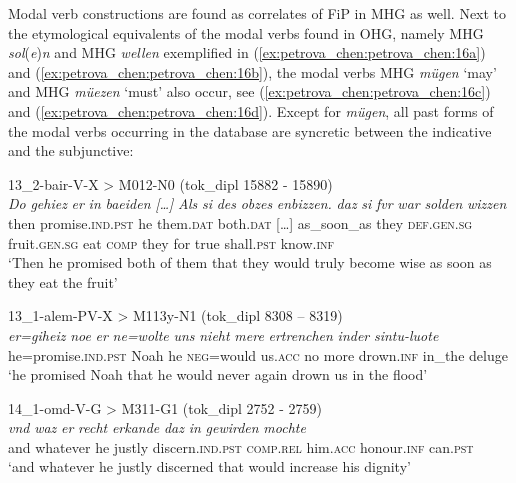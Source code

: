 \documentclass[output=paper,colorlinks,citecolor=brown]{langscibook}
\begin{document}
Modal verb constructions are found as correlates of FiP in MHG as well. Next to the etymological equivalents of the modal verbs found in OHG, namely MHG \textit{sol}(\textit{e})\textit{n} and MHG \textit{wellen} exemplified in (\ref{ex:petrova_chen:petrova_chen:16a}) and (\ref{ex:petrova_chen:petrova_chen:16b}), the modal verbs MHG \textit{mügen} ‘may’ and MHG \textit{müezen} ‘must’ also occur, see (\ref{ex:petrova_chen:petrova_chen:16c}) and (\ref{ex:petrova_chen:petrova_chen:16d}). Except for \textit{mügen}, all past forms of the modal verbs occurring in the database are syncretic between the indicative and the subjunctive:

\ea 
\ea \label{ex:petrova_chen:petrova_chen:16a} 13\_2-bair-V-X > M012-N0 (tok\_dipl 15882 - 15890)\\
\gll \textit{Do} \textit{gehiez} \textit{er} \textit{in} \textit{baeiden} \textit{[…]} \textit{Als} \textit{si} \textit{des} \textit{obzes} \textit{enbizzen.} \textit{daz} \textit{si} \textit{fvr} \textit{war} \textit{solden} \textit{wizzen}\\
then promise.\textsc{ind.pst} he them.\textsc{dat} both.\textsc{dat} […] as\_soon\_as they \textsc{def.gen.sg} fruit.\textsc{gen.sg} eat \textsc{comp} they for true shall.\textsc{pst} know.\textsc{inf}\\
\glt ‘Then he promised both of them that they would truly become wise as soon as they eat the fruit’

\ex \label{ex:petrova_chen:petrova_chen:16b} 13\_1-alem-PV-X > M113y-N1 (tok\_dipl 8308 – 8319)\\
\gll \textit{er=giheiz} \textit{noe} \textit{er} \textit{ne=wolte} \textit{uns} \textit{nieht} \textit{mere} \textit{ertrenchen} \textit{inder} \textit{sintu-luote}\\
he=promise.\textsc{ind.pst} Noah he \textsc{neg}=would us.\textsc{acc} no more drown.\textsc{inf} in\_the deluge\\
\glt ‘he promised Noah that he would never again drown us in the flood’

\ex \label{ex:petrova_chen:petrova_chen:16c} 14\_1-omd-V-G > M311-G1 (tok\_dipl 2752 - 2759)\\
\gll \textit{vnd} \textit{waz} \textit{er} \textit{recht} \textit{erkande} \textit{daz} \textit{in} \textit{gewirden} \textit{mochte}\\
and whatever he justly discern.\textsc{ind.pst} \textsc{comp.rel} him.\textsc{acc} honour.\textsc{inf} can.\textsc{pst}\\
\glt ‘and whatever he justly discerned that would increase his dignity’
\end{document}
